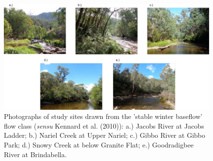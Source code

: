\begin{landscape}
\begin{figure}[h!]
\begin{center}
\includegraphics[width=20cm]{site_photos_1.pdf} %
\caption[Photographs of study sites drawn from the 'stable winter baseflow' flow class.]{\small{Photographs of study sites drawn from the 'stable winter baseflow' flow class (\textit{sensu} Kennard et al. (2010)): a.) Jacobs River at Jacobs Ladder; b.) Nariel Creek at Upper Nariel; c.) Gibbo River at Gibbo Park; d.) Snowy Creek at below Granite Flat; e.) Goodradigbee River at Brindabella.}} %
\label{fig:biophysical_supp_F3} %
\end{center}
\end{figure}   
\end{landscape}
\clearpage

